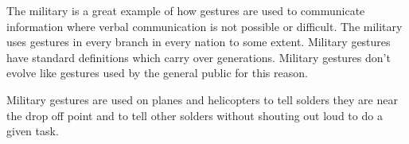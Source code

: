 The military is a great example of how gestures are used to communicate information where verbal communication is not possible or difficult. The military uses gestures in every branch in every nation to some extent. Military gestures have standard definitions which carry over generations. Military gestures don't evolve like gestures used by the general public for this reason. \cite{militarygesture}

Military gestures are used on planes and helicopters to tell solders they are near the drop off point and to tell other solders without shouting out loud to do a given task. \cite{militarygesture}